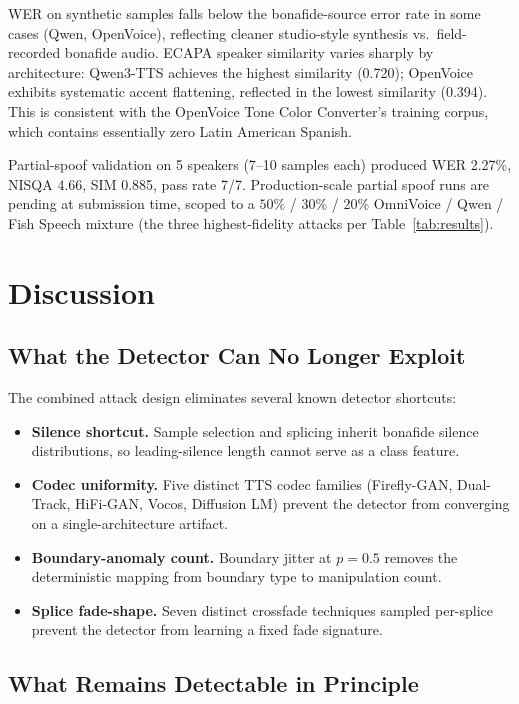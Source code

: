 \documentclass[conference]{IEEEtran}
\begin{document}
WER on synthetic samples falls below the bonafide-source error rate in some cases (Qwen, OpenVoice), reflecting cleaner studio-style synthesis vs.\ field-recorded bonafide audio. ECAPA speaker similarity varies sharply by architecture: Qwen3-TTS achieves the highest similarity (0.720); OpenVoice exhibits systematic accent flattening, reflected in the lowest similarity (0.394). This is consistent with the OpenVoice Tone Color Converter's training corpus, which contains essentially zero Latin American Spanish.

Partial-spoof validation on 5 speakers (7--10 samples each) produced WER 2.27\%, NISQA 4.66, SIM 0.885, pass rate 7/7. Production-scale partial spoof runs are pending at submission time, scoped to a $50\%$ / $30\%$ / $20\%$ OmniVoice / Qwen / Fish Speech mixture (the three highest-fidelity attacks per Table~\ref{tab:results}).

\section{Discussion}

\subsection{What the Detector Can No Longer Exploit}

The combined attack design eliminates several known detector shortcuts:

\begin{itemize}
    \item \textbf{Silence shortcut.} Sample selection and splicing inherit bonafide silence distributions, so leading-silence length cannot serve as a class feature.
    \item \textbf{Codec uniformity.} Five distinct TTS codec families (Firefly-GAN, Dual-Track, HiFi-GAN, Vocos, Diffusion LM) prevent the detector from converging on a single-architecture artifact.
    \item \textbf{Boundary-anomaly count.} Boundary jitter at $p{=}0.5$ removes the deterministic mapping from boundary type to manipulation count.
    \item \textbf{Splice fade-shape.} Seven distinct crossfade techniques sampled per-splice prevent the detector from learning a fixed fade signature.
\end{itemize}

\subsection{What Remains Detectable in Principle}
\end{document}
